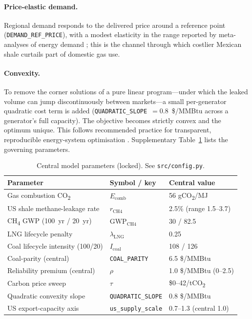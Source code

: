 \documentclass[11pt]{article}
\begin{document}
\paragraph{Price-elastic demand.} Regional demand responds to the delivered
price around a reference point (\texttt{DEMAND\_REF\_PRICE}), with a modest
elasticity in the range reported by meta-analyses of energy demand
\citep{Labandeira2017}; this is the channel through which costlier Mexican
shale curtails part of domestic gas use.

\paragraph{Convexity.} To remove the corner solutions of a pure linear
program---under which the leaked volume can jump discontinuously between
markets---a small per-generator quadratic cost term is added
(\texttt{QUADRATIC\_SLOPE}~$=0.8$~\$/MMBtu across a generator's full
capacity). The objective becomes strictly convex and the optimum unique. This
follows recommended practice for transparent, reproducible energy-system
optimisation \citep{DeCarolis2017}. Supplementary
Table~\ref{tab:params} lists the governing parameters.

\begin{table}[H]\centering
\caption{Central model parameters (locked). See \texttt{src/config.py}.}\label{tab:params}
\begin{tabular}{@{}lll@{}}
\toprule
Parameter & Symbol / key & Central value \\
\midrule
Gas combustion CO\textsubscript{2}       & $E_{\mathrm{comb}}$      & 56 gCO\textsubscript{2}/MJ \\
US shale methane-leakage rate            & $r_{\mathrm{CH4}}$       & 2.5\% (range 1.5--3.7) \\
CH\textsubscript{4} GWP (100~yr / 20~yr) & $\mathrm{GWP_{CH4}}$     & 30 / 82.5 \\
LNG lifecycle penalty                    & $\lambda_{\mathrm{LNG}}$ & 0.25 \\
Coal lifecycle intensity (100/20)        & $I_{\mathrm{coal}}$      & 108 / 126 \\
Coal-parity (central)                    & \texttt{COAL\_PARITY}    & 6.5 \$/MMBtu \\
Reliability premium (central)            & $\rho$                   & 1.0 \$/MMBtu (0--2.5) \\
Carbon price sweep                       & $\tau$                   & \$0--42/tCO\textsubscript{2} \\
Quadratic convexity slope                & \texttt{QUADRATIC\_SLOPE}& 0.8 \$/MMBtu \\
US export-capacity axis                  & \texttt{us\_supply\_scale}& 0.7--1.3 (central 1.0) \\
\bottomrule
\end{tabular}
\end{table}
\end{document}
